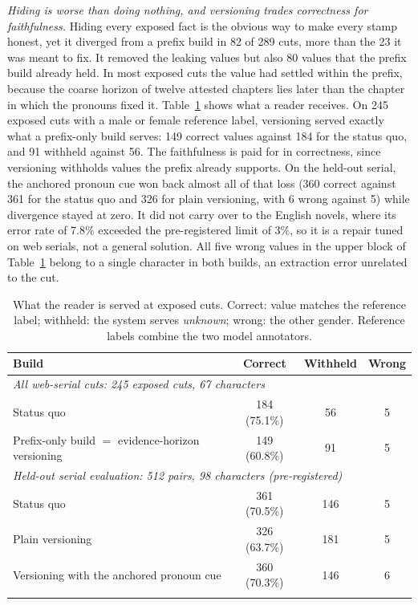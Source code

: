 \documentclass[sn-mathphys]{sn-jnl}%
\theoremstyle{thmstyleone}%
\theoremstyle{thmstyletwo}%
\theoremstyle{thmstylethree}%
\begin{document}
\emph{Hiding is worse than doing nothing, and versioning trades correctness for faithfulness.} Hiding every exposed fact is the obvious way to make every stamp honest, yet it diverged from a prefix build in 82 of 289 cuts, more than the 23 it was meant to fix. It removed the leaking values but also 80 values that the prefix build already held. In most exposed cuts the value had settled within the prefix, because the coarse horizon of twelve attested chapters lies later than the chapter in which the pronouns fixed it. Table~\ref{tab:repair} shows what a reader receives. On 245 exposed cuts with a male or female reference label, versioning served exactly what a prefix-only build serves: 149 correct values against 184 for the status quo, and 91 withheld against 56. The faithfulness is paid for in correctness, since versioning withholds values the prefix already supports. On the held-out serial, the anchored pronoun cue won back almost all of that loss (360 correct against 361 for the status quo and 326 for plain versioning, with 6 wrong against 5) while divergence stayed at zero. It did not carry over to the English novels, where its error rate of 7.8\% exceeded the pre-registered limit of 3\%, so it is a repair tuned on web serials, not a general solution. All five wrong values in the upper block of Table~\ref{tab:repair} belong to a single character in both builds, an extraction error unrelated to the cut.

\begin{table}[!t]
\caption{What the reader is served at exposed cuts. Correct: value matches the reference label; withheld: the system serves \emph{unknown}; wrong: the other gender. Reference labels combine the two model annotators.}\label{tab:repair}
\footnotesize
\begin{tabular*}{\textwidth}{@{\extracolsep\fill}p{6.4cm}ccc}
\toprule
Build & Correct & Withheld & Wrong \\
\midrule
\multicolumn{4}{l}{\emph{All web-serial cuts: 245 exposed cuts, 67 characters}} \\
Status quo & 184 (75.1\%) & 56 & 5 \\
Prefix-only build $=$ evidence-horizon versioning & 149 (60.8\%) & 91 & 5 \\
\multicolumn{4}{l}{\emph{Held-out serial evaluation: 512 pairs, 98 characters (pre-registered)}} \\
Status quo & 361 (70.5\%) & 146 & 5 \\
Plain versioning & 326 (63.7\%) & 181 & 5 \\
Versioning with the anchored pronoun cue & 360 (70.3\%) & 146 & 6 \\
\botrule
\end{tabular*}
\end{table}
\end{document}
